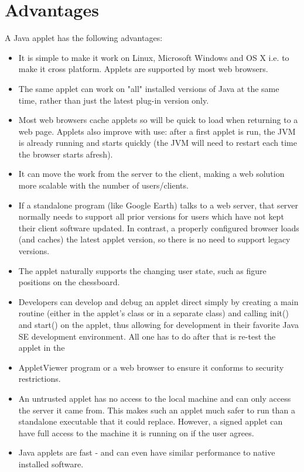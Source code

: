 \section{Advantages}
A Java applet has the following advantages:
\begin{itemize}
\item It is simple to make it work on Linux, Microsoft Windows and OS X i.e. to make it cross platform. Applets are supported by most web browsers.
\item The same applet can work on "all" installed versions of Java at the same time, rather than just the latest plug-in version only.
\item Most web browsers cache applets so will be quick to load when returning to a web page. Applets also improve with use: after a first applet is run, the JVM is already running and starts quickly (the JVM will need to restart each time the browser starts afresh).
\item It can move the work from the server to the client, making a web solution more scalable with the number of users/clients.
\item If a standalone program (like Google Earth) talks to a web server, that server normally needs to support all prior versions for users which have not kept their client software updated. In contrast, a properly configured browser loads (and caches) the latest applet version, so there is no need to support legacy versions.
\item The applet naturally supports the changing user state, such as figure positions on the chessboard.
\item Developers can develop and debug an applet direct simply by creating a main routine (either in the applet's class or in a separate class) and calling init() and start() on the applet, thus allowing for development in their favorite Java SE development environment. All one has to do after that is re-test the applet in the 
\item AppletViewer program or a web browser to ensure it conforms to security restrictions.
\item An untrusted applet has no access to the local machine and can only access the server it came from. This makes such an applet much safer to run than a standalone executable that it could replace. However, a signed applet can have full access to the machine it is running on if the user agrees.
\item Java applets are fast - and can even have similar performance to native installed software.
\end{itemize}